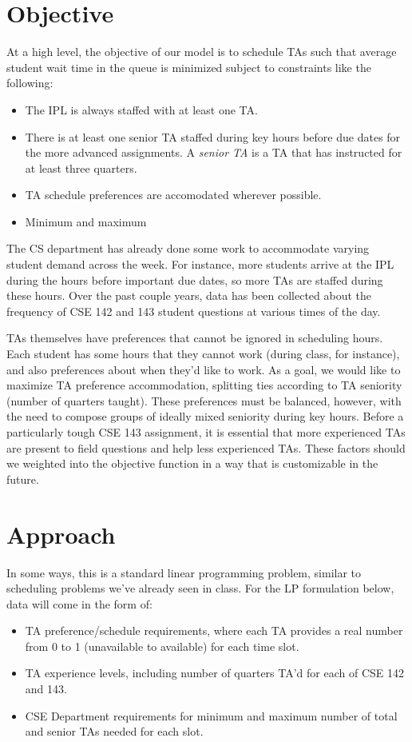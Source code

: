 \documentclass{article}
\begin{document}
\begin{multicols}{2}
\section*{Objective}

At a high level, the objective of our model is to schedule TAs such that average student wait time in the queue is minimized subject to constraints like the following:
\begin{itemize}
    \item The IPL is always staffed with at least one TA.
    \item There is at least one senior TA staffed during key hours before due dates for the more advanced assignments. A \textit{senior TA} is a TA that has instructed for at least three quarters.
    \item TA schedule preferences are accomodated wherever possible.
    \item Minimum and maximum 
\end{itemize}

The CS department has already done some work to accommodate varying student demand across the week. For instance, more students arrive at the IPL during the hours before important due dates, so more TAs are staffed during these hours. Over the past couple years, data has been collected about the frequency of CSE 142 and 143 student questions at various times of the day.

TAs themselves have preferences that cannot be ignored in scheduling hours. Each student has some hours that they cannot work (during class, for instance), and also preferences about when they'd like to work. As a goal, we would like to maximize TA preference accommodation, splitting ties according to TA seniority (number of quarters taught). These preferences must be balanced, however, with the need to compose groups of ideally mixed seniority during key hours. Before a particularly tough CSE 143 assignment, it is essential that more experienced TAs are present to field questions and help less experienced TAs. These factors should we weighted into the objective function in a way that is customizable in the future.

\section*{Approach}
In some ways, this is a standard linear programming problem, similar to scheduling problems we've already seen in class. For the LP formulation below, data will come in the form of:
\begin{itemize}
    \item TA preference/schedule requirements, where each TA provides a real number from 0 to 1 (unavailable to available) for each time slot.
    \item TA experience levels, including number of quarters TA'd for each of CSE 142 and 143.
    \item CSE Department requirements for minimum and maximum number of total and senior TAs needed for each slot.
\end{itemize}


\end{multicols}
\end{document}
